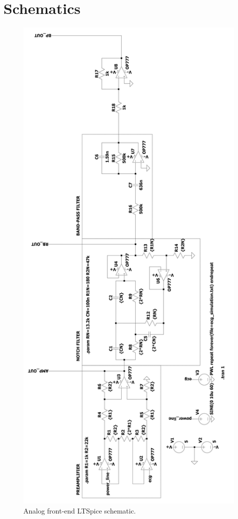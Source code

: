\appendix
\section{Schematics}

\begin{figure}[h!] 
    \includegraphics[width=\textwidth, height=\textheight,keepaspectratio]{images/afe_rot.jpg}
    \caption{Analog front-end LTSpice schematic.}
    \label{fig:appendix:1} 
\end{figure}

\pagebreak
